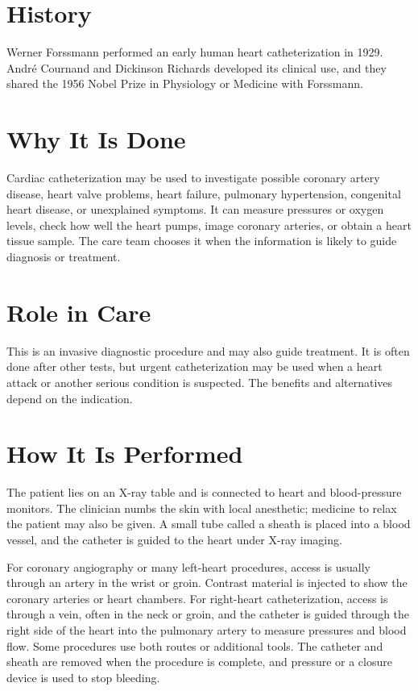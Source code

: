 \section*{History}
Werner Forssmann performed an early human heart catheterization in 1929. André Cournand and Dickinson Richards developed its clinical use, and they shared the 1956 Nobel Prize in Physiology or Medicine with Forssmann.

\section*{Why It Is Done}
Cardiac catheterization may be used to investigate possible coronary artery disease, heart valve problems, heart failure, pulmonary hypertension, congenital heart disease, or unexplained symptoms. It can measure pressures or oxygen levels, check how well the heart pumps, image coronary arteries, or obtain a heart tissue sample. The care team chooses it when the information is likely to guide diagnosis or treatment.

\section*{Role in Care}
This is an invasive diagnostic procedure and may also guide treatment. It is often done after other tests, but urgent catheterization may be used when a heart attack or another serious condition is suspected. The benefits and alternatives depend on the indication.

\section*{How It Is Performed}
The patient lies on an X-ray table and is connected to heart and blood-pressure monitors. The clinician numbs the skin with local anesthetic; medicine to relax the patient may also be given. A small tube called a sheath is placed into a blood vessel, and the catheter is guided to the heart under X-ray imaging.

For coronary angiography or many left-heart procedures, access is usually through an artery in the wrist or groin. Contrast material is injected to show the coronary arteries or heart chambers. For right-heart catheterization, access is through a vein, often in the neck or groin, and the catheter is guided through the right side of the heart into the pulmonary artery to measure pressures and blood flow. Some procedures use both routes or additional tools. The catheter and sheath are removed when the procedure is complete, and pressure or a closure device is used to stop bleeding.

